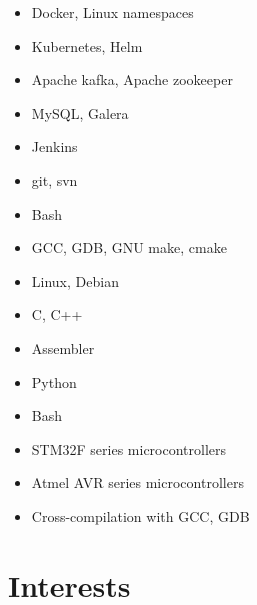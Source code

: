 \documentclass[12]{article}
\begin{document}
\begin{multicols}{2}

\begin{itemize}
	\item{Docker, Linux namespaces}
	\item{Kubernetes, Helm}
	\item{Apache kafka, Apache zookeeper}
	\item{MySQL, Galera}
	\item{Jenkins}
	\item{git, svn}
	\item{Bash}
	\item{GCC, GDB, GNU make, cmake}
	\item{Linux, Debian}
\end{itemize}

\columnbreak

\begin{itemize}
	\item{C, C++}
	\item{Assembler}
	\item{Python}
	\item{Bash}
\end{itemize}


\begin{itemize}
	\item{STM32F series microcontrollers}
	\item{Atmel AVR series microcontrollers}
	\item{Cross-compilation with GCC, GDB}
\end{itemize}


\vfill
\end{multicols}

\section{Interests}

\end{document}
